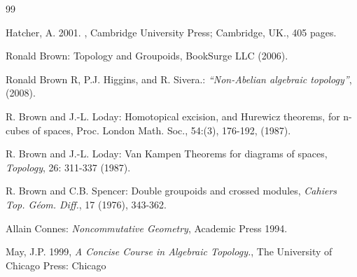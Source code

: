 \documentclass[12pt]{article}
\theoremstyle{plain}
\theoremstyle{definition}
\numberwithin{equation}{section}
\begin{document}
\begin{thebibliography} {99}

Hatcher, A. 2001. , Cambridge University Press; Cambridge, UK., 405 pages.

Ronald Brown: Topology and Groupoids, BookSurge LLC (2006).

Ronald Brown R, P.J. Higgins, and R. Sivera.: \emph{``Non-Abelian algebraic topology''}, (2008).

R. Brown and J.-L. Loday: Homotopical excision, and Hurewicz theorems, for n-cubes of spaces, Proc. London Math. Soc., 54:(3), 176-192, (1987).

R. Brown and J.-L. Loday: Van Kampen Theorems for diagrams of spaces, {\em Topology}, 26: 311-337 (1987).

R. Brown and C.B. Spencer: Double groupoids and crossed modules, {\em Cahiers Top. G\'eom. Diff.}, 17 (1976), 343-362.

Allain Connes: \emph{Noncommutative Geometry}, Academic Press 1994.

May, J.P. 1999, \emph{A Concise Course in Algebraic Topology.}, The University of Chicago Press: Chicago

\end{thebibliography}
\end{document}
